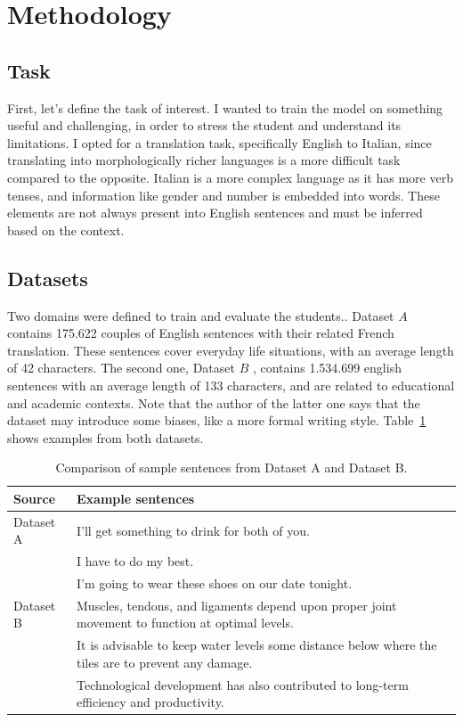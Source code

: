 \documentclass[pdflatex,sn-mathphys-num]{sn-jnl}%
\theoremstyle{thmstyleone}%
\theoremstyle{thmstyletwo}%
\theoremstyle{thmstylethree}%
\begin{document}
\section{Methodology}\label{sec2}

\subsection{Task}\label{sec2.1}

First, let's define the task of interest. I wanted to train the model on something useful and challenging, in order to stress the student and understand its limitations. I opted for a translation task, specifically English to Italian, since translating into morphologically richer languages is a more difficult task \cite{chahuneau2013translating} compared to the opposite. Italian is a more complex language as it has more verb tenses, and information like gender and number is embedded into words. These elements are not always present into English sentences and must be inferred based on the context.

\subsection{Datasets}\label{sec2.2}

Two domains were defined to train and evaluate the students.. Dataset $A$ \cite{charles_kelly_2020} contains 175.622 couples of English sentences with their related French translation. These sentences cover everyday life situations, with an average length of 42 characters. The second one, Dataset $B$ \cite{agentlans2023highquality}, contains 1.534.699 english sentences with an average length of 133 characters, and are related to educational and academic contexts. Note that the author of the latter one says that the dataset may introduce some biases, like a more formal writing style. Table~\ref{tab:dataset_examples} shows examples from both datasets.

\begin{table}[h]
	\centering
	\renewcommand{\arraystretch}{1.5}
	\begin{tabular}{p{} p{}}
		\hline
		\textbf{Source} & \textbf{Example sentences} \\
		\hline
		Dataset A	& I'll get something to drink for both of you. \\
					& I have to do my best. \\
					& I'm going to wear these shoes on our date tonight. \\
		\hline
		Dataset B	& Muscles, tendons, and ligaments depend upon proper joint movement to function at optimal levels. \\
					& It is advisable to keep water levels some distance below where the tiles are to prevent any damage. \\
					& Technological development has also contributed to long-term efficiency and productivity. \\
		\hline
	\end{tabular}
	\caption{Comparison of sample sentences from Dataset A and Dataset B.}
	\label{tab:dataset_examples}
\end{table}
\end{document}
